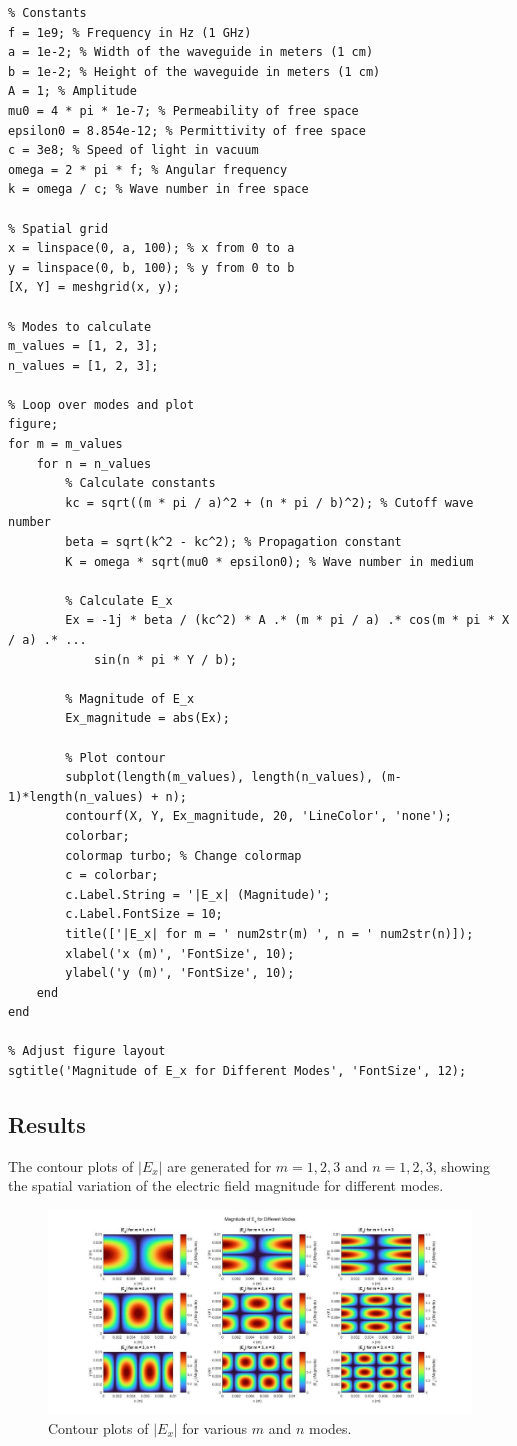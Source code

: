 \documentclass[14pt]{article}
\newcommand*{\nsubsection}[1]{
    \subsection*{#1}
    \addcontentsline{toc}{subsection}{#1}
}
\begin{document}
\begin{verbatim}
% Constants
f = 1e9; % Frequency in Hz (1 GHz)
a = 1e-2; % Width of the waveguide in meters (1 cm)
b = 1e-2; % Height of the waveguide in meters (1 cm)
A = 1; % Amplitude
mu0 = 4 * pi * 1e-7; % Permeability of free space
epsilon0 = 8.854e-12; % Permittivity of free space
c = 3e8; % Speed of light in vacuum
omega = 2 * pi * f; % Angular frequency
k = omega / c; % Wave number in free space

% Spatial grid
x = linspace(0, a, 100); % x from 0 to a
y = linspace(0, b, 100); % y from 0 to b
[X, Y] = meshgrid(x, y);

% Modes to calculate
m_values = [1, 2, 3];
n_values = [1, 2, 3];

% Loop over modes and plot
figure;
for m = m_values
    for n = n_values
        % Calculate constants
        kc = sqrt((m * pi / a)^2 + (n * pi / b)^2); % Cutoff wave number
        beta = sqrt(k^2 - kc^2); % Propagation constant
        K = omega * sqrt(mu0 * epsilon0); % Wave number in medium

        % Calculate E_x
        Ex = -1j * beta / (kc^2) * A .* (m * pi / a) .* cos(m * pi * X / a) .* ...
            sin(n * pi * Y / b);

        % Magnitude of E_x
        Ex_magnitude = abs(Ex);

        % Plot contour
        subplot(length(m_values), length(n_values), (m-1)*length(n_values) + n);
        contourf(X, Y, Ex_magnitude, 20, 'LineColor', 'none');
        colorbar;
        colormap turbo; % Change colormap
        c = colorbar;
        c.Label.String = '|E_x| (Magnitude)';
        c.Label.FontSize = 10;
        title(['|E_x| for m = ' num2str(m) ', n = ' num2str(n)]);
        xlabel('x (m)', 'FontSize', 10);
        ylabel('y (m)', 'FontSize', 10);
    end
end

% Adjust figure layout
sgtitle('Magnitude of E_x for Different Modes', 'FontSize', 12);
\end{verbatim}

\nsubsection{Results}

The contour plots of \(|E_x|\) are generated for \(m = 1, 2, 3\) and \(n = 1, 2, 3\), showing the spatial variation of the electric field magnitude for different modes.

\begin{figure}[ht]
  \centering
  \includegraphics[scale=0.35]{figures/Figure_6.jpg}
  \caption{Contour plots of $|E_x|$ for various $m$ and $n$ modes.}
\end{figure}
\end{document}

